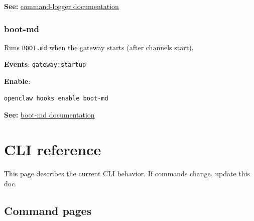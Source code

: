 \textbf{See:} \href{/automation/hooks\#command-logger}{command-logger documentation}

\subsubsection{boot-md}


Runs \texttt{BOOT.md} when the gateway starts (after channels start).

\textbf{Events}: \texttt{gateway:startup}

\textbf{Enable}:

\begin{lstlisting}[language=bash]
openclaw hooks enable boot-md
\end{lstlisting}


\textbf{See:} \href{/automation/hooks\#boot-md}{boot-md documentation}


\clearpage

\section{CLI reference}


This page describes the current CLI behavior. If commands change, update this doc.

\subsection{Command pages}


